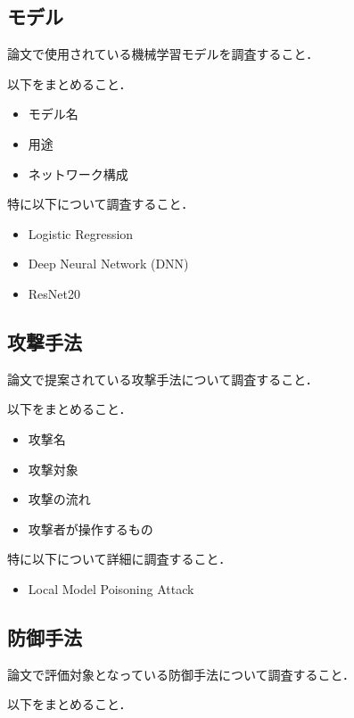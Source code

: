 \documentclass[a4j, twocolumn]{jsarticle}  %
\begin{document}
\subsection{モデル}

論文で使用されている機械学習モデルを調査すること．

以下をまとめること．

\begin{itemize}
    \item モデル名
    \item 用途
    \item ネットワーク構成
\end{itemize}

特に以下について調査すること．

\begin{itemize}
    \item Logistic Regression
    \item Deep Neural Network (DNN)
    \item ResNet20
\end{itemize}

\subsection{攻撃手法}

論文で提案されている攻撃手法について調査すること．

以下をまとめること．

\begin{itemize}
    \item 攻撃名
    \item 攻撃対象
    \item 攻撃の流れ
    \item 攻撃者が操作するもの
\end{itemize}

特に以下について詳細に調査すること．

\begin{itemize}
    \item Local Model Poisoning Attack
\end{itemize}

\subsection{防御手法}

論文で評価対象となっている防御手法について調査すること．

以下をまとめること．
\end{document}
